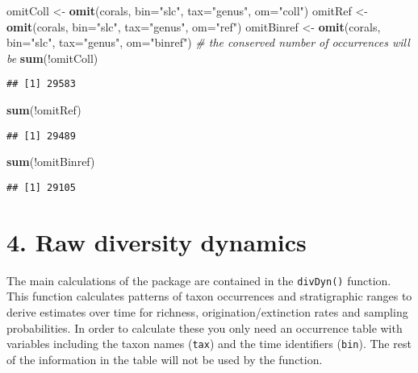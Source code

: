 \documentclass[]{article}
\newenvironment{Shaded}{\begin{snugshade}}{\end{snugshade}}
\newcommand{\KeywordTok}[1]{\textcolor[rgb]{0.13,0.29,0.53}{\textbf{{#1}}}}
\newcommand{\DataTypeTok}[1]{\textcolor[rgb]{0.13,0.29,0.53}{{#1}}}
\newcommand{\StringTok}[1]{\textcolor[rgb]{0.31,0.60,0.02}{{#1}}}
\newcommand{\CommentTok}[1]{\textcolor[rgb]{0.56,0.35,0.01}{\textit{{#1}}}}
\newcommand{\NormalTok}[1]{{#1}}
\begin{document}
\begin{Shaded}
\begin{Highlighting}[]
\NormalTok{omitColl <-}\StringTok{ }\KeywordTok{omit}\NormalTok{(corals, }\DataTypeTok{bin=}\StringTok{"slc"}\NormalTok{, }\DataTypeTok{tax=}\StringTok{"genus"}\NormalTok{, }\DataTypeTok{om=}\StringTok{"coll"}\NormalTok{)}
\NormalTok{omitRef <-}\StringTok{ }\KeywordTok{omit}\NormalTok{(corals, }\DataTypeTok{bin=}\StringTok{"slc"}\NormalTok{, }\DataTypeTok{tax=}\StringTok{"genus"}\NormalTok{, }\DataTypeTok{om=}\StringTok{"ref"}\NormalTok{)}
\NormalTok{omitBinref <-}\StringTok{ }\KeywordTok{omit}\NormalTok{(corals, }\DataTypeTok{bin=}\StringTok{"slc"}\NormalTok{, }\DataTypeTok{tax=}\StringTok{"genus"}\NormalTok{, }\DataTypeTok{om=}\StringTok{"binref"}\NormalTok{)}
\CommentTok{# the conserved number of occurrences will be}
\KeywordTok{sum}\NormalTok{(!omitColl)}
\end{Highlighting}
\end{Shaded}

\begin{verbatim}
## [1] 29583
\end{verbatim}

\begin{Shaded}
\begin{Highlighting}[]
\KeywordTok{sum}\NormalTok{(!omitRef)}
\end{Highlighting}
\end{Shaded}

\begin{verbatim}
## [1] 29489
\end{verbatim}

\begin{Shaded}
\begin{Highlighting}[]
\KeywordTok{sum}\NormalTok{(!omitBinref)}
\end{Highlighting}
\end{Shaded}

\begin{verbatim}
## [1] 29105
\end{verbatim}

\section{4. Raw diversity dynamics}\label{raw-diversity-dynamics}

The main calculations of the package are contained in the
\texttt{divDyn()} function. This function calculates patterns of taxon
occurrences and stratigraphic ranges to derive estimates over time for
richness, origination/extinction rates and sampling probabilities. In
order to calculate these you only need an occurrence table with
variables including the taxon names (\texttt{tax}) and the time
identifiers (\texttt{bin}). The rest of the information in the table
will not be used by the function.
\end{document}
